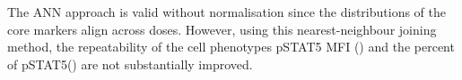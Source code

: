 The \gls{ANN} approach is valid without normalisation since the distributions of the core markers align across doses.
However, using this nearest-neighbour joining method, the repeatability of the cell phenotypes pSTAT5 MFI ()
and the percent of pSTAT5\positive () are not substantially improved.

